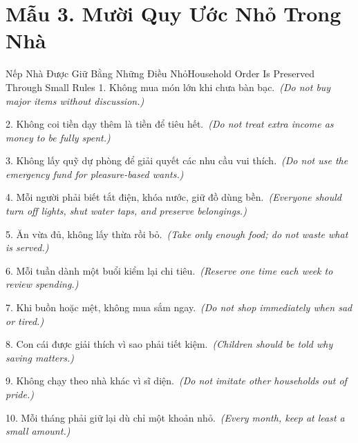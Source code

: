 \section*{Mẫu 3. Mười Quy Ước Nhỏ Trong Nhà}
\begin{truyen}{Nếp Nhà Được Giữ Bằng Những Điều Nhỏ}{Household Order Is Preserved Through Small Rules}
1. Không mua món lớn khi chưa bàn bạc.\
\textit{(Do not buy major items without discussion.)}

2. Không coi tiền dạy thêm là tiền để tiêu hết.\
\textit{(Do not treat extra income as money to be fully spent.)}

3. Không lấy quỹ dự phòng để giải quyết các nhu cầu vui thích.\
\textit{(Do not use the emergency fund for pleasure-based wants.)}

4. Mỗi người phải biết tắt điện, khóa nước, giữ đồ dùng bền.\
\textit{(Everyone should turn off lights, shut water taps, and preserve belongings.)}

5. Ăn vừa đủ, không lấy thừa rồi bỏ.\
\textit{(Take only enough food; do not waste what is served.)}

6. Mỗi tuần dành một buổi kiểm lại chi tiêu.\
\textit{(Reserve one time each week to review spending.)}

7. Khi buồn hoặc mệt, không mua sắm ngay.\
\textit{(Do not shop immediately when sad or tired.)}

8. Con cái được giải thích vì sao phải tiết kiệm.\
\textit{(Children should be told why saving matters.)}

9. Không chạy theo nhà khác vì sĩ diện.\
\textit{(Do not imitate other households out of pride.)}

10. Mỗi tháng phải giữ lại dù chỉ một khoản nhỏ.\
\textit{(Every month, keep at least a small amount.)}
\end{truyen}

